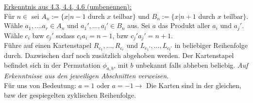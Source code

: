 \documentclass[a4paper]{article}
\begin{document}
    \underline{Erkenntnis aus 4.3, 4.4, 4.6 (umbenennen):} \\
    Für $n \in $  sei $A_n := \lbrace x \big\vert n-1$ durch $x$ teilbar$\rbrace$ und $B_n := \lbrace x \big\vert n+1$ durch $x$ teilbar$\rbrace$. \\
    Wähle $a_1, …. a_r \in A_n$ und $a_1', …, a_l' \in B_n$ aus. Sei $a$ das Produkt aller $a_i$ und $a_j'$. Wähle $c_i$ bzw $c_j'$ sodass $c_ia_i = n-1$, bzw $c_j'a_j' = n+1$. \\
    Führe auf einen Kartenstapel $R_{c_1}, …, R_{c_r}$ und $L_{c_1'}, …, L_{c_l'}$ in beliebiger Reihenfolge durch. Dazwischen darf noch zusätzlich abgehoben werden. Der Kartenstapel befindet sich in der Permutation $\phi_{a,b}$, mit $b$ unbekannt falls abheben beliebig. \textit{Auf Erkenntnisse aus den jeweiligen Abschnitten verweisen}. \\
    Für uns von Bedeutung: $a=1$ oder $a=-1 \rightarrow$ Die Karten sind in der gleichen, bzw der gespiegelten zyklischen Reihenfolge.
\end{document}
